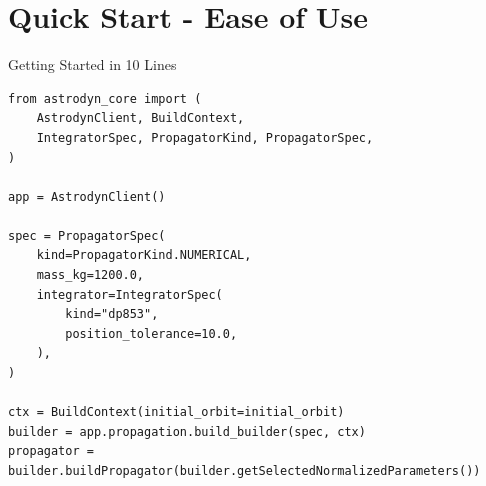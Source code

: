 \documentclass[aspectratio=169,12pt]{beamer}
\begin{document}
\section{Quick Start - Ease of Use}

\begin{frame}[fragile]{Getting Started in 10 Lines}
    \begin{verbatim}
from astrodyn_core import (
    AstrodynClient, BuildContext,
    IntegratorSpec, PropagatorKind, PropagatorSpec,
)

app = AstrodynClient()

spec = PropagatorSpec(
    kind=PropagatorKind.NUMERICAL,
    mass_kg=1200.0,
    integrator=IntegratorSpec(
        kind="dp853",
        position_tolerance=10.0,
    ),
)

ctx = BuildContext(initial_orbit=initial_orbit)
builder = app.propagation.build_builder(spec, ctx)
propagator = builder.buildPropagator(builder.getSelectedNormalizedParameters())
    \end{verbatim}
\end{frame}
\end{document}
